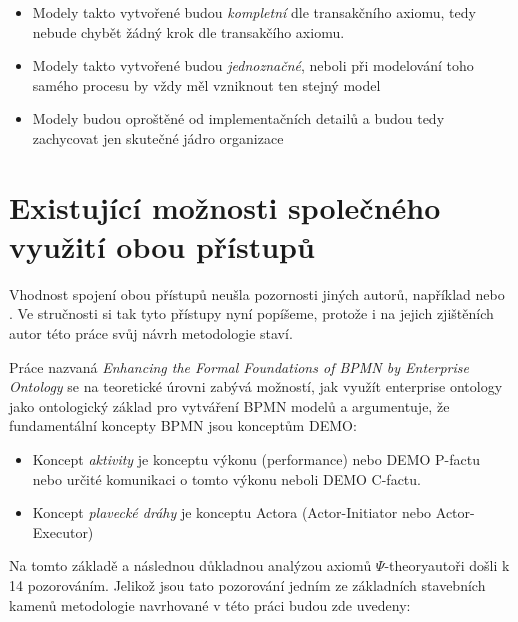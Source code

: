 \documentclass[]{article}
\newcommand{\ptheory}{$\Psi$-theory}
\begin{document}
\begin{itemize}
\item Modely takto vytvořené budou \textit{kompletní} dle transakčního axiomu, tedy nebude chybět žádný krok dle transakčího axiomu. %
\item Modely takto vytvořené budou \textit{jednoznačné}, neboli při modelování toho samého procesu by vždy měl vzniknout ten stejný model
\item Modely budou oproštěné od implementačních detailů a budou tedy zachycovat jen skutečné jádro organizace
\end{itemize}


\section{Existující možnosti společného využití obou přístupů} \label{sec:existujici_moznosti}
Vhodnost spojení obou přístupů neušla pozornosti jiných autorů, například \cite{VanNuffel2009} nebo %
. Ve stručnosti si tak tyto přístupy nyní popíšeme, protože i na jejich zjištěních autor této práce svůj návrh metodologie staví.

Práce \cite{VanNuffel2009} nazvaná \textit{Enhancing the Formal Foundations of BPMN by Enterprise Ontology} se na teoretické úrovni zabývá možností, jak využít enterprise ontology jako ontologický základ pro vytváření BPMN modelů a argumentuje, že fundamentální koncepty BPMN jsou  konceptům DEMO:

\begin{itemize}
\item Koncept \textit{aktivity} je  konceptu výkonu (performance) nebo DEMO P-factu nebo určité komunikaci o tomto výkonu neboli DEMO C-factu.
\item Koncept \textit{plavecké dráhy} je  konceptu Actora (Actor-Initiator nebo Actor-Executor)
\end{itemize}

Na tomto základě a následnou důkladnou analýzou axiomů \ptheory autoři došli k 14 pozorováním. Jelikož jsou tato pozorování jedním ze základních stavebních kamenů metodologie navrhované v této práci budou zde uvedeny:
\end{document}
